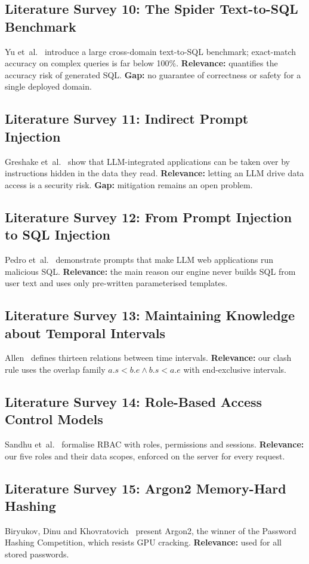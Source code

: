 \subsection{Literature Survey 10: The Spider Text-to-SQL Benchmark}
Yu et~al.~\cite{yu2018} introduce a large cross-domain text-to-SQL benchmark; exact-match accuracy on
complex queries is far below 100\%. \textbf{Relevance:} quantifies the accuracy risk of generated SQL.
\textbf{Gap:} no guarantee of correctness or safety for a single deployed domain.

\subsection{Literature Survey 11: Indirect Prompt Injection}
Greshake et~al.~\cite{greshake2023} show that LLM-integrated applications can be taken over by
instructions hidden in the data they read. \textbf{Relevance:} letting an LLM drive data access is a
security risk. \textbf{Gap:} mitigation remains an open problem.

\subsection{Literature Survey 12: From Prompt Injection to SQL Injection}
Pedro et~al.~\cite{pedro2023} demonstrate prompts that make LLM web applications run malicious SQL.
\textbf{Relevance:} the main reason our engine never builds SQL from user text and uses only
pre-written parameterised templates.

\subsection{Literature Survey 13: Maintaining Knowledge about Temporal Intervals}
Allen~\cite{allen1983} defines thirteen relations between time intervals. \textbf{Relevance:} our clash
rule uses the overlap family $a.s < b.e \wedge b.s < a.e$ with end-exclusive intervals.

\subsection{Literature Survey 14: Role-Based Access Control Models}
Sandhu et~al.~\cite{sandhu1996} formalise RBAC with roles, permissions and sessions.
\textbf{Relevance:} our five roles and their data scopes, enforced on the server for every request.

\subsection{Literature Survey 15: Argon2 Memory-Hard Hashing}
Biryukov, Dinu and Khovratovich~\cite{biryukov2016} present Argon2, the winner of the Password Hashing
Competition, which resists GPU cracking. \textbf{Relevance:} used for all stored passwords.

